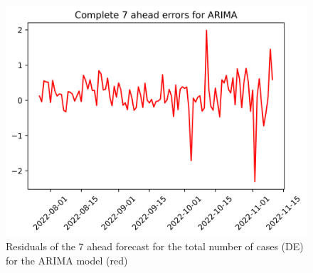 \begin{figure}
\begin{minipage}{.32\textwidth}
\end{minipage}
\begin{minipage}{.32\textwidth}
  \centering
  \includegraphics[width=\linewidth]{pics/7_ah/DE_7_ahead_errors_ARIMA.png}
  \caption{Residuals of the 7 ahead forecast for the total number of cases (DE) for the ARIMA model (red)}
  \label{fig:tot_cases_error_7_ARIMA_DE}
\end{minipage}

\end{figure}
